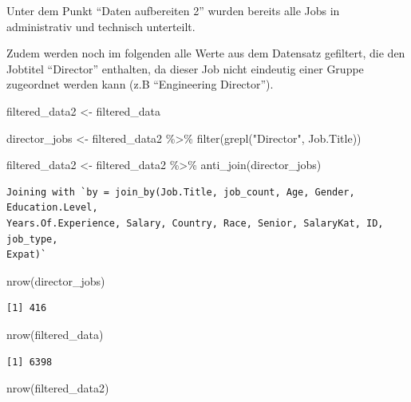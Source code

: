 \documentclass[
  letterpaper,
  DIV=11,
  numbers=noendperiod]{scrartcl}
\newenvironment{Shaded}{\begin{snugshade}}{\end{snugshade}}
\newcommand{\FunctionTok}[1]{\textcolor[rgb]{0.28,0.35,0.67}{#1}}
\newcommand{\NormalTok}[1]{\textcolor[rgb]{0.00,0.23,0.31}{#1}}
\newcommand{\OtherTok}[1]{\textcolor[rgb]{0.00,0.23,0.31}{#1}}
\newcommand{\SpecialCharTok}[1]{\textcolor[rgb]{0.37,0.37,0.37}{#1}}
\newcommand{\StringTok}[1]{\textcolor[rgb]{0.13,0.47,0.30}{#1}}
\begin{document}
Unter dem Punkt ``Daten aufbereiten 2'' wurden bereits alle Jobs in
administrativ und technisch unterteilt.

Zudem werden noch im folgenden alle Werte aus dem Datensatz gefiltert,
die den Jobtitel ``Director'' enthalten, da dieser Job nicht eindeutig
einer Gruppe zugeordnet werden kann (z.B ``Engineering Director'').

\begin{Shaded}
\begin{Highlighting}[]
\NormalTok{filtered\_data2 }\OtherTok{\textless{}{-}}\NormalTok{ filtered\_data}

\NormalTok{director\_jobs }\OtherTok{\textless{}{-}}\NormalTok{ filtered\_data2 }\SpecialCharTok{\%\textgreater{}\%}
  \FunctionTok{filter}\NormalTok{(}\FunctionTok{grepl}\NormalTok{(}\StringTok{"Director"}\NormalTok{, Job.Title))}

\NormalTok{filtered\_data2 }\OtherTok{\textless{}{-}}\NormalTok{ filtered\_data2 }\SpecialCharTok{\%\textgreater{}\%}
  \FunctionTok{anti\_join}\NormalTok{(director\_jobs)}
\end{Highlighting}
\end{Shaded}

\begin{verbatim}
Joining with `by = join_by(Job.Title, job_count, Age, Gender, Education.Level,
Years.Of.Experience, Salary, Country, Race, Senior, SalaryKat, ID, job_type,
Expat)`
\end{verbatim}

\begin{Shaded}
\begin{Highlighting}[]
\FunctionTok{nrow}\NormalTok{(director\_jobs)}
\end{Highlighting}
\end{Shaded}

\begin{verbatim}
[1] 416
\end{verbatim}

\begin{Shaded}
\begin{Highlighting}[]
\FunctionTok{nrow}\NormalTok{(filtered\_data)}
\end{Highlighting}
\end{Shaded}

\begin{verbatim}
[1] 6398
\end{verbatim}

\begin{Shaded}
\begin{Highlighting}[]
\FunctionTok{nrow}\NormalTok{(filtered\_data2)}
\end{Highlighting}
\end{Shaded}
\end{document}
